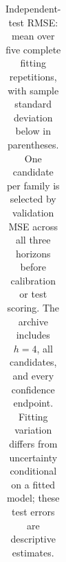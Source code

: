 \begin{table}[t]
\begin{tabular}{lrrrrrrrr}
\bottomrule
\end{tabular}
\caption{Independent-test RMSE: mean over five complete fitting repetitions, with sample standard deviation below in parentheses. One candidate per family is selected by validation MSE across all three horizons before calibration or test scoring. The archive includes $h=4$, all candidates, and every confidence endpoint. Fitting variation differs from uncertainty conditional on a fitted model; these test errors are descriptive estimates.}
\label{tab:forecast}
\end{table}
